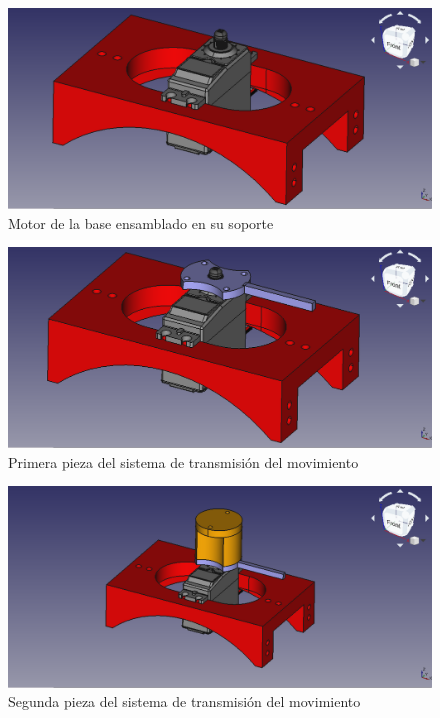 \begin{figure}[H]
    \centering 
    \includegraphics[width=1\linewidth]{pictures/MotorHoldYMotor.png}
    \caption{Motor de la base ensamblado en su soporte}
    \label{fig:motor_ensamblado_soporte}
\end{figure}

\begin{figure}[H]
    \centering 
    \includegraphics[width=1\linewidth]{pictures/MotorMasPrimeraPieza.png}
    \caption{Primera pieza del sistema de transmisión del movimiento}
    \label{fig:primera_pieza_sistema_transmision}
\end{figure}

\begin{figure}[H]
    \centering 
    \includegraphics[width=1\linewidth]{pictures/MotorMasSegundaPieza.png}
    \caption{Segunda pieza del sistema de transmisión del movimiento}
    \label{fig:segunda_pieza_sistema_transmision}
\end{figure}

